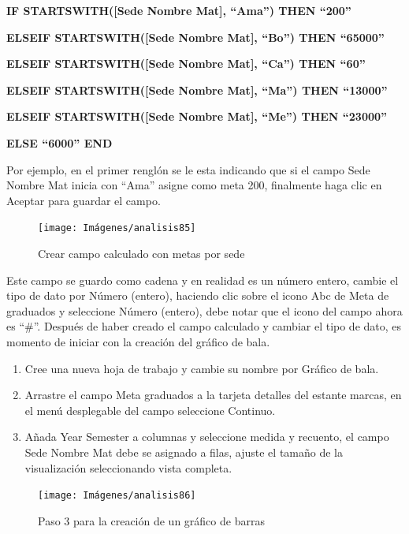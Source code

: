 \documentclass[
]{book}
\begin{document}
\textbf{IF STARTSWITH({[}Sede Nombre Mat{]}, ``Ama'') THEN ``200'' }

\textbf{ELSEIF STARTSWITH({[}Sede Nombre Mat{]}, ``Bo'') THEN ``65000''}

\textbf{ELSEIF STARTSWITH({[}Sede Nombre Mat{]}, ``Ca'') THEN ``60''}

\textbf{ELSEIF STARTSWITH({[}Sede Nombre Mat{]}, ``Ma'') THEN ``13000''}

\textbf{ELSEIF STARTSWITH({[}Sede Nombre Mat{]}, ``Me'') THEN ``23000''}

\textbf{ELSE ``6000'' END}

Por ejemplo, en el primer renglón se le esta indicando que si el campo Sede Nombre Mat inicia con ``Ama'' asigne como meta 200, finalmente haga clic en Aceptar para guardar el campo.

\begin{figure}

{\centering \texttt{[image: Imágenes/analisis85]} 

}

\caption{Crear campo calculado con metas por sede}\label{fig:campocalculadometas-fig}
\end{figure}

Este campo se guardo como cadena y en realidad es un número entero, cambie el tipo de dato por Número (entero), haciendo clic sobre el icono Abc de Meta de graduados y seleccione Número (entero), debe notar que el icono del campo ahora es ``\#''. Después de haber creado el campo calculado y cambiar el tipo de dato, es momento de iniciar con la creación del gráfico de bala.

\begin{enumerate}
\def\labelenumi{\arabic{enumi}.}
\item
  Cree una nueva hoja de trabajo y cambie su nombre por Gráfico de bala.
\item
  Arrastre el campo Meta graduados a la tarjeta detalles del estante marcas, en el menú desplegable del campo seleccione Continuo.
\item
  Añada Year Semester a columnas y seleccione medida y recuento, el campo Sede Nombre Mat debe se asignado a filas, ajuste el tamaño de la visualización seleccionando vista completa.
\end{enumerate}

\begin{figure}

{\centering \texttt{[image: Imágenes/analisis86]} 

}

\caption{Paso 3 para la creación de un gráfico de barras}\label{fig:paso3graficobala-fig}
\end{figure}
\end{document}
